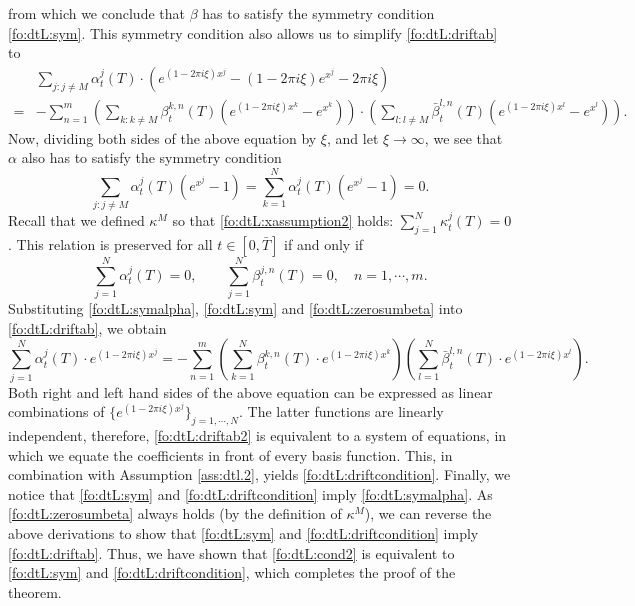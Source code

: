 \documentclass{article}
\numberwithin{equation}{section}
\def\bT{\bar{T}}
\def\bbeta{\bar{\beta}}
\begin{document}
from which we conclude that $\beta$ has to satisfy the symmetry condition \eqref{fo:dtL:sym}.
This symmetry condition also allows us to simplify \eqref{fo:dtL:driftab} to
\begin{align*}
& \underset{j:j\neq M}\sum \alpha_t^j(T) \cdot \left( e^{(1-2\pi i\xi) x^j} - (1 - 2\pi i\xi)e^{x^j}- 2\pi i\xi \right) \\
= & -\sum_{n=1}^m \left(\underset{k:k\neq M}\sum \beta_t^{k,n}(T)(e^{(1-2\pi i\xi) x^k} - e^{x^k}) \right)\cdot \left( \underset{l:l\neq M}\sum \bbeta_t^{l,n}(T) ( e^{(1-2\pi i\xi) x^l} - e^{x^l})\right).
\end{align*}
Now, dividing both sides of the above equation by $\xi$, and let $\xi \rightarrow \infty$, we see that $\alpha$ also has to satisfy the symmetry condition
\begin{equation}\label{fo:dtL:symalpha}
\underset{j:j\neq M}\sum \alpha_t^{j}(T) (e^{x^j} - 1) = \sum_{k=1}^N \alpha_t^{j}(T) (e^{x^j} - 1) = 0.
\end{equation}
Recall that we defined $\kappa^M$ so that \eqref{fo:dtL:xassumption2} holds: $\sum_{j=1}^N \kappa^j_t(T) = 0$. This relation is preserved for all $t\in[0,\bT]$ if and only if
\begin{equation}\label{fo:dtL:zerosumbeta}
\sum_{j=1}^N \alpha^j_t(T) = 0, \quad \quad \sum_{j=1}^N \beta^{j,n}_t(T)  = 0, \quad n= 1, \cdots, m.
\end{equation}
Substituting \eqref{fo:dtL:symalpha}, \eqref{fo:dtL:sym} and \eqref{fo:dtL:zerosumbeta} into \eqref{fo:dtL:driftab}, we obtain
\begin{equation} \label{fo:dtL:driftab2}
\sum_{j=1}^N \alpha_t^j(T) \cdot e^{(1-2\pi i\xi) x^j} =-\sum_{n=1}^m \left(\sum_{k=1}^N \beta_t^{k,n}(T)\cdot e^{(1-2\pi i\xi) x^k} \right) \left( \sum_{l=1}^N \bbeta_t^{l,n}(T) \cdot e^{(1-2\pi i\xi) x^l}\right).
\end{equation}
Both right and left hand sides of the above equation can be expressed as linear combinations of $\{e^{(1-2\pi i \xi)x^j}\}_{j = 1,\cdots,N}$. The latter functions are linearly independent, therefore, \eqref{fo:dtL:driftab2} is equivalent to a system of equations, in which we equate the coefficients in front of every basis function. This, in combination with Assumption \ref{ass:dtl.2}, yields \eqref{fo:dtL:driftcondition}.
Finally, we notice that \eqref{fo:dtL:sym} and \eqref{fo:dtL:driftcondition} imply \eqref{fo:dtL:symalpha}. As \eqref{fo:dtL:zerosumbeta} always holds (by the definition of $\kappa^M$), we can reverse the above derivations to show that \eqref{fo:dtL:sym} and \eqref{fo:dtL:driftcondition} imply \eqref{fo:dtL:driftab}. Thus, we have shown that \eqref{fo:dtL:cond2} is equivalent to \eqref{fo:dtL:sym} and \eqref{fo:dtL:driftcondition}, which completes the proof of the theorem.
\end{document}
